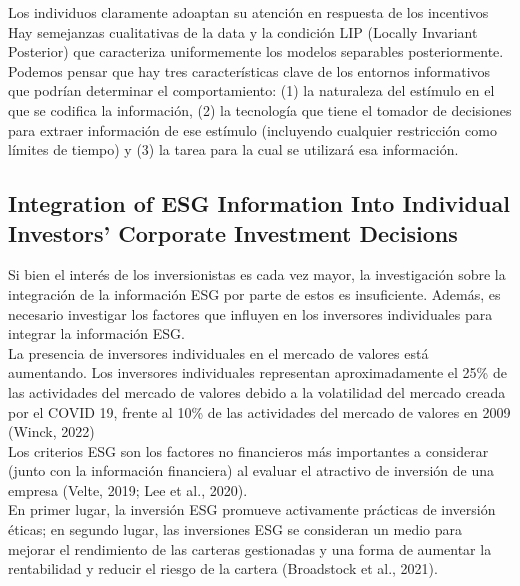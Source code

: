 \documentclass[11pt,letterpaper]{article}
\begin{document}
Los individuos claramente adoaptan su atención en respuesta de los incentivos\\

Hay semejanzas cualitativas de la data  y la condición LIP (Locally Invariant Posterior) que caracteriza uniformemente los modelos separables posteriormente.\\

Podemos pensar que hay tres características clave de los entornos informativos que podrían determinar el comportamiento: (1) la naturaleza del estímulo en el que se codifica la información, (2) la tecnología que tiene el tomador de decisiones para extraer información de ese estímulo (incluyendo cualquier restricción como límites de tiempo) y (3) la tarea para la cual se utilizará esa información.\\

\subsection{Integration of ESG Information Into Individual Investors' Corporate Investment Decisions}

Si bien el interés de los inversionistas es cada vez mayor, la investigación sobre la integración de la información ESG por parte de estos es insuficiente. Además, es necesario investigar los factores que influyen en los inversores individuales para integrar la información ESG.\\

La presencia de inversores individuales en el mercado de valores está aumentando. Los inversores individuales representan aproximadamente el 25\% de las actividades del mercado de valores debido a la volatilidad del mercado creada por el COVID 19, frente al 10\% de las actividades del mercado de valores en 2009 (Winck, 2022)\\

Los criterios ESG son los factores no financieros más importantes a considerar (junto con la información financiera) al evaluar el atractivo de inversión de una empresa (Velte, 2019; Lee et al., 2020).\\

En primer lugar, la inversión ESG promueve activamente prácticas de inversión éticas; en segundo lugar, las inversiones ESG se consideran un medio para mejorar el rendimiento de las carteras gestionadas y una forma de aumentar la rentabilidad y reducir el riesgo de la cartera (Broadstock et al., 2021).\\
\end{document}
